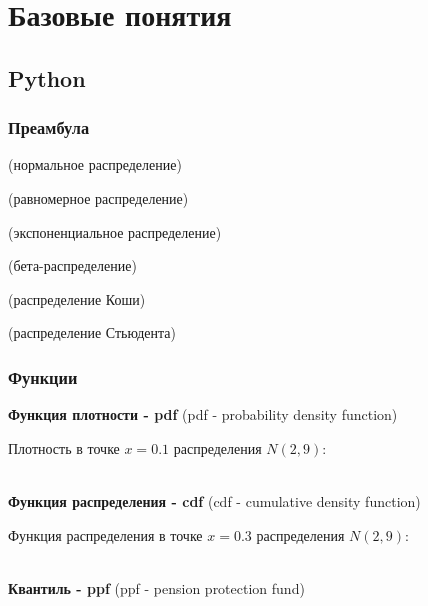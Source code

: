 \chapter{Базовые понятия}\label{cha:basic}

\section{Python}\label{cha:basic/sec:python}

\subsection{Преамбула}\label{cha:basic/sec:python/subsec:preambula}




	 (нормальное распределение)

	 (равномерное распределение)

	 (экспоненциальное распределение)

	 (бета-распределение)

	 (распределение Коши)

	 (распределение Стьюдента)

\subsection{Функции}\label{cha:basic/sec:python/subsec:funcs}

\textbf{Функция плотности - pdf} (pdf - probability density function)

	Плотность в точке $x=0.1$ распределения $N(2,9)$:

	\\

\textbf{Функция распределения - cdf} (cdf - cumulative density function)

	Функция распределения в точке $x=0.3$ распределения $N(2,9)$:

	\\

\textbf{Квантиль - ppf} (ppf - pension protection fund)

